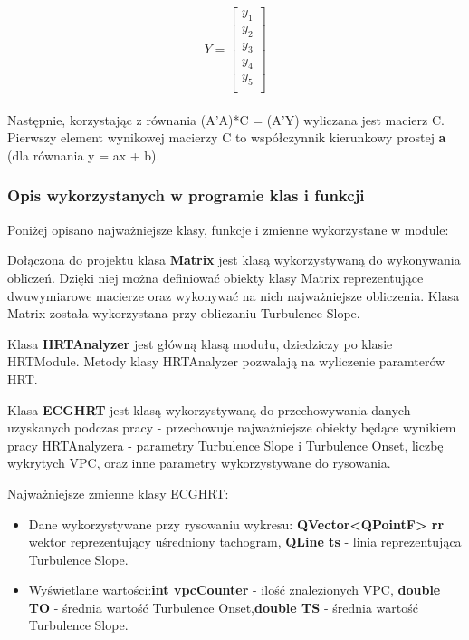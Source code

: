\documentclass[a4paper, 11pt]{article}
\begin{document}
\begin{equation}
Y =  \left[
 \begin{array}{ccc}
   y_{1} \\
   y_{2} \\
   y_{3} \\ 
   y_{4} \\
   y_{5} \\ 
 \end{array}
\right]
\end{equation}
\\
Następnie, korzystając z równania  (A'A)*C = (A'Y) wyliczana jest macierz C.
Pierwszy element wynikowej macierzy C to współczynnik kierunkowy prostej \textbf{a} (dla równania y = ax + b).
\subsubsection{Opis wykorzystanych w programie klas i funkcji}
\label{sec:hrt:results}

Poniżej opisano najważniejsze klasy, funkcje i zmienne wykorzystane w module:
   
Dołączona do projektu klasa \textbf{Matrix} jest klasą wykorzystywaną do wykonywania obliczeń. Dzięki niej można
definiować obiekty klasy Matrix reprezentujące dwuwymiarowe macierze oraz wykonywać na nich najważniejsze obliczenia.
Klasa Matrix została wykorzystana przy obliczaniu Turbulence Slope.

Klasa  \textbf{HRTAnalyzer} jest główną klasą modułu, dziedziczy po klasie HRTModule. Metody klasy HRTAnalyzer 
pozwalają na wyliczenie paramterów HRT.

Klasa \textbf{ECGHRT} jest klasą wykorzystywaną do przechowywania danych uzyskanych podczas pracy - przechowuje
najważniejsze obiekty będące wynikiem pracy HRTAnalyzera - parametry Turbulence Slope i Turbulence Onset, 
liczbę wykrytych VPC, oraz inne parametry wykorzystywane do rysowania.

Najważniejsze zmienne klasy ECGHRT:
\begin{itemize} 
\item Dane wykorzystywane przy rysowaniu wykresu: \textbf{QVector<QPointF> rr} wektor reprezentujący uśredniony tachogram, 
\textbf{QLine ts} - linia reprezentująca Turbulence Slope.
\item Wyświetlane wartości:\textbf{int vpcCounter} - ilość znalezionych VPC, \textbf{double TO} -  średnia wartość Turbulence Onset,\textbf{double TS} - średnia wartość Turbulence Slope.
\end{itemize}
\end{document}
